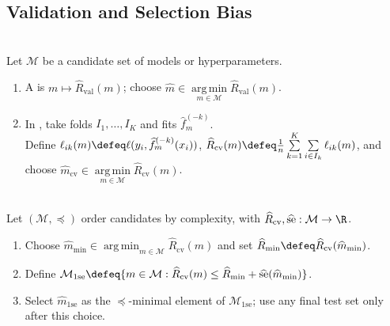 \subsection{Validation and Selection Bias}
\begin{definition} \label{def:sl-model-selection-validation} \\
Let $\mathcal{M}$ be a candidate set of models or hyperparameters.
\begin{enumerate}[label=(\roman*)]
\setlength{\itemsep}{0pt}
\item A  is $m\mapsto\widehat{R}_{\mathrm{val}}(m)$; choose $\widehat{m}\in\operatorname*{arg\,min}\limits_{m\in\mathcal{M}}\widehat{R}_{\mathrm{val}}(m)$.
\item In , take folds $I_1,\ldots,I_K$ and fits $\widehat{f}^{(-k)}_m$.\\
Define $\ell_{ik}(m)\defeq\ell(y_i,\widehat{f}^{(-k)}_m(x_i))$, $\widehat{R}_{\mathrm{cv}}(m)\defeq \frac{1}{n}\sum\limits_{k=1}^K\sum\limits_{i\in I_k}\ell_{ik}(m)$, and choose $\widehat{m}_{\mathrm{cv}}\in\operatorname*{arg\,min}\limits_{m\in\mathcal{M}}\widehat{R}_{\mathrm{cv}}(m)$.
\end{enumerate}
\end{definition}

\begin{method} \label{meth:sl-one-standard-error-rule} \\
Let $(\mathcal{M},\preceq)$ order candidates by complexity, with $\widehat{R}_{\mathrm{cv}},\widehat{\operatorname{se}}:\mathcal{M}\to\R$.
\begin{enumerate}[label=(\roman*)]
\setlength{\itemsep}{0pt}
\item Choose $\widehat{m}_{\min}\in\operatorname*{arg\,min}_{m\in\mathcal{M}}\widehat{R}_{\mathrm{cv}}(m)$ and set $\widehat{R}_{\min}\defeq\widehat{R}_{\mathrm{cv}}(\widehat{m}_{\min})$.
\item Define $\mathcal{M}_{1\mathrm{se}}\defeq\{m\in\mathcal{M}:\widehat{R}_{\mathrm{cv}}(m)\leq\widehat{R}_{\min}+\widehat{\operatorname{se}}(\widehat{m}_{\min})\}$.
\item Select $\widehat{m}_{1\mathrm{se}}$ as the $\preceq$-minimal element of $\mathcal{M}_{1\mathrm{se}}$; use any final test set only after this choice.
\end{enumerate}
\end{method}


